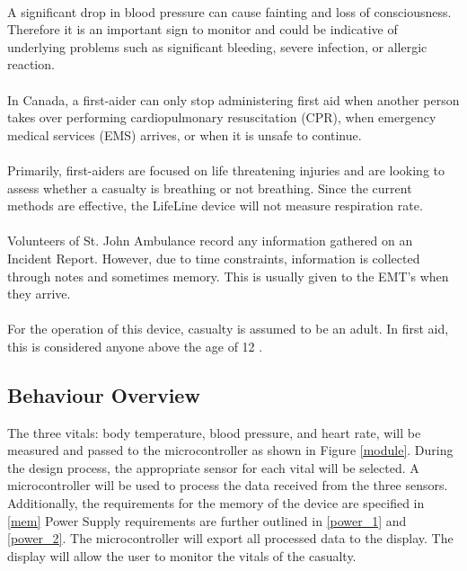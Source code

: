 \documentclass{article}
\begin{document}
	\paragraph{}
	A significant drop in blood pressure can cause fainting and loss of consciousness. Therefore it is an important sign to monitor and could be indicative of underlying problems such as significant bleeding, severe infection, or allergic reaction.
	\paragraph{}
	In Canada, a first-aider can only stop administering first aid when another person takes over performing cardiopulmonary resuscitation (CPR), when emergency medical services (EMS) arrives, or when it is unsafe to continue. 
	\paragraph{}
	Primarily, first-aiders are focused on life threatening injuries and are looking to assess whether a casualty is breathing or not breathing. Since the current methods are effective, the LifeLine device will not measure respiration rate. 
	\paragraph{}
    Volunteers of St. John Ambulance \citep{sja} record any information gathered on an Incident Report. However, due to time constraints, information is collected through notes and sometimes memory. This is usually given to the EMT's when they arrive.
    \paragraph{}
    For the operation of this device, casualty is assumed to be an adult. In first aid, this is considered anyone above the age of 12 \citep{redcross}.

	\newpage

	\subsection{Behaviour Overview}
    The three vitals: body temperature, blood pressure, and heart rate, will be measured and passed to the microcontroller as shown in Figure \ref{module}.  During the design process, the appropriate sensor for each vital will be selected.  A microcontroller will be used to process the data received from the three sensors.  Additionally, the requirements for the memory of the device are specified in \ref{mem}  Power Supply requirements are further outlined in \ref{power_1} and \ref{power_2}.  The microcontroller will export all processed data to the display.  The display will allow the user to monitor the vitals of the casualty.
    
\end{document}
